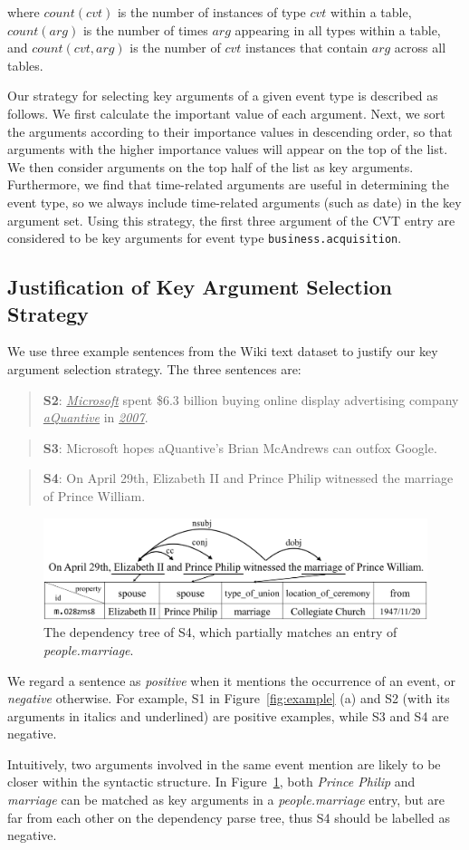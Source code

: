 where $count(cvt)$ is the number of instances of type $cvt$ within a \CVT table, $count(arg)$ is the number of times $arg$ appearing in all
\CVT types within a \CVT table, and $count(cvt, arg)$ is the number of $cvt$ instances that contain $arg$ across all \CVT tables.


Our strategy for selecting key arguments of a given event type is described as follows. We first calculate the important value of each
argument. Next, we sort the arguments according to their importance values in descending order, so that arguments with the higher
importance values will appear on the top of the list. We then consider arguments on the top half of the list as key arguments. Furthermore,
we find that time-related arguments are useful in determining the event type, so we always include time-related arguments (such as date) in
the key argument set. Using this strategy, the first three argument of the CVT entry are considered to be key arguments for event type
\texttt{business.acquisition}.


\subsection{Justification of Key Argument Selection Strategy}
We use three example sentences from the Wiki text dataset to justify our key argument selection strategy. The three sentences are:

\begin{quote}
\textbf{S2}: \underline{\emph{Microsoft}} spent \$6.3 billion buying online display advertising company \underline{\emph{aQuantive}} in
\underline{\emph{2007}}.
\end{quote}
\begin{quote}
\textbf{S3}: Microsoft hopes aQuantive's Brian McAndrews can outfox Google.
\end{quote}
\begin{quote}
\textbf{S4}: On April 29th, Elizabeth II and Prince Philip witnessed the marriage of Prince William.
\end{quote}
\begin{figure}
\centering
	\includegraphics[width=.48\textwidth]{figure2.png}
	\caption{The dependency tree of S4, which partially matches an entry of \emph{people.marriage}. \label{fig:2}}
\end{figure}
We regard a sentence as \emph{positive} when it mentions the occurrence of an event, or  \emph{negative} otherwise. For example, S1 in
Figure~\ref {fig:example} (a) and S2 (with its arguments in italics and underlined) are positive examples, while S3 and S4 are negative.


Intuitively, two arguments involved in the same event mention are likely to be closer within the syntactic structure.  In
Figure~\ref{fig:2}, both \emph{Prince Philip} and \emph{marriage} can be matched as key arguments in a \textit{people.marriage} entry, but
are far from each other on the dependency parse tree, thus S4 should be labelled as negative.
